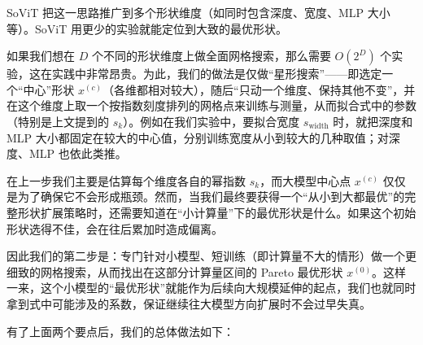 \documentclass[zihao=false,fontset=windows]{ctexart}
\begin{document}
SoViT 把这一思路推广到多个形状维度（如同时包含深度、宽度、MLP 大小等）。SoViT 用更少的实验就能定位到大致的最优形状。\par

\par{}\vspace{1em}\par\vspace{0.28em}

如果我们想在 $D$ 个不同的形状维度上做全面网格搜索，那么需要 $O(2^D)$ 个实验，这在实践中非常昂贵。为此，我们的做法是仅做“星形搜索”——即选定一个“中心”形状 $x^{(c)}$（各维都相对较大），随后“只动一个维度、保持其他不变”，并在这个维度上取一个按指数刻度排列的网格点来训练与测量，从而拟合式中的参数（特别是上文提到的 $s_k$）。例如在我们实验中，要拟合宽度 $s_{\mathrm{width}}$ 时，就把深度和 MLP 大小都固定在较大的中心值，分别训练宽度从小到较大的几种取值；对深度、MLP 也依此类推。\par

\par{}\vspace{1em}\par\vspace{0.28em}

在上一步我们主要是估算每个维度各自的幂指数 $s_k$，而大模型中心点 $x^{(c)}$ 仅仅是为了确保它不会形成瓶颈。然而，当我们最终要获得一个“从小到大都最优”的完整形状扩展策略时，还需要知道在“小计算量”下的最优形状是什么。如果这个初始形状选得不佳，会在往后累加时造成偏离。\par

因此我们的第二步是：专门针对小模型、短训练（即计算量不大的情形）做一个更细致的网格搜索，从而找出在这部分计算量区间的 Pareto 最优形状 $x^{(0)}$。这样一来，这个小模型的“最优形状”就能作为后续向大规模延伸的起点，我们也就同时拿到式中可能涉及的系数，保证继续往大模型方向扩展时不会过早失真。\par

\par{}\vspace{1em}\par\vspace{0.28em}

有了上面两个要点后，我们的总体做法如下：\par
\end{document}
